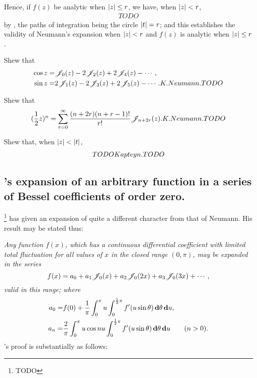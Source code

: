 \documentclass{book}
\begin{document}
Hence, if $f(z)$ be analytic when $\left| z \right| \leq r$, we have, when
$\left| z \right| < r$,
\begin{align*}
  TODO
\end{align*}
by , the paths of integration being the circle
$\left| t \right|=r$; and this establishes the validity of Neumann's
expansion when $\left| z \right| < r$ and $f(z)$ is analytic when
$\left| z \right|\leq r$.

% 
%
\begin{wandwexample}
  Shew that
  \begin{align*}
    \cos z =& \mathscr{J}_0(z) - 2\mathscr{J}_2(z) + 2\mathscr{J}_4(z) - \cdots, \\
    \sin z =& 2\mathscr{J}_1(z) - 2\mathscr{J}_3(z) + 2\mathscr{J}_5(z) - \cdots.
    K. Neumann. TODO
  \end{align*}
\end{wandwexample}
\begin{wandwexample}
  Shew that
  $$
  (\frac{1}{2} z)^n
  =
  \sum_{r=0}^{\infty}
  \frac{(n+2r)(n+r-1)!}{r!}
  \mathscr{J}_{n+2r}(z).
  K. Neumann. TODO
  $$
\end{wandwexample}
\begin{wandwexample}
  Shew that, when $\left| z \right|<\left| t \right|$,
  \begin{align*}
    TODO
    Kapteyn. TODO
  \end{align*}
\end{wandwexample}

\subsection{\Schlomilch's expansion of an arbitrary function in a
  series of Bessel coefficients of order zero.}
\Schlomilch\footnote{TODO} has given an expansion of quite a different
character from that of Neumann. His result may be stated thus:

\emph{
  Any function $f(x)$, which has a continuous differential coefficient
  with limited total fluctuation for all values of $x$ in the closed
  range $(0,\pi)$, may be expanded in the series
  $$
  f(x)
  =
  a_0 + a_1 \mathscr{J}_0(x) + a_2 \mathscr{J}_0(2x) + a_3 \mathscr{J}_0(3x) + \cdots,
  $$
  valid in this range; where
  \begin{align*}
    a_0 =& f(0)
    +
    \frac{1}{\pi}
    \int_{0}^{\pi} u
    \int_{0}^{\frac{1}{2}\pi} f'(u\sin\theta)
    \, \mathbf{d}\theta \, \mathbf{d} u,
    \\
    a_n =&
    \frac{2}{\pi}
    \int_{0}^{\pi} u\cos nu
    \int_{0}^{\frac{1}{2}\pi} f'(u\sin\theta)
    \, \mathbf{d}\theta \, \mathbf{d} u
    \qquad (n>0).
  \end{align*}
}
\Schlomilch's proof is substantially as follows:
\end{document}
